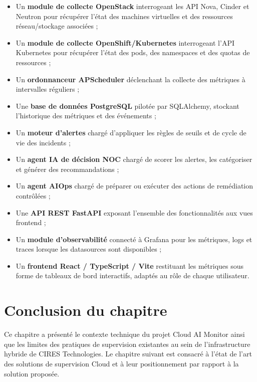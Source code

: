 \documentclass[11pt,a4paper]{report}
\begin{document}
\begin{itemize}[label=\textbullet, leftmargin=1.5cm, labelsep=0.5cm,
                itemsep=0.1em, parsep=0em, topsep=0.2em]
    \item Un \textbf{module de collecte OpenStack} interrogeant les API Nova,
    Cinder et Neutron pour récupérer l'état des machines virtuelles et des
    ressources réseau/stockage associées ;
    \item Un \textbf{module de collecte OpenShift/Kubernetes} interrogeant
    l'API Kubernetes pour récupérer l'état des pods, des namespaces et des
    quotas de ressources ;
    \item Un \textbf{ordonnanceur APScheduler} déclenchant la collecte des
    métriques à intervalles réguliers ;
    \item Une \textbf{base de données PostgreSQL} pilotée par SQLAlchemy,
    stockant l'historique des métriques et des événements ;
    \item Un \textbf{moteur d'alertes} chargé d'appliquer les règles de
    seuils et de cycle de vie des incidents ;
    \item Un \textbf{agent IA de décision NOC} chargé de scorer les alertes,
    les catégoriser et générer des recommandations ;
    \item Un \textbf{agent AIOps} chargé de préparer ou exécuter des actions
    de remédiation contrôlées ;
    \item Une \textbf{API REST FastAPI} exposant l'ensemble des
    fonctionnalités aux vues frontend ;
    \item Un \textbf{module d'observabilité} connecté à Grafana pour les
    métriques, logs et traces lorsque les datasources sont disponibles ;
    \item Un \textbf{frontend React / TypeScript / Vite} restituant les
    métriques sous forme de tableaux de bord interactifs, adaptés au rôle de
    chaque utilisateur.
\end{itemize}

\section*{Conclusion du chapitre}

Ce chapitre a présenté le contexte technique du projet Cloud AI Monitor ainsi
que les limites des pratiques de supervision existantes au sein de
l'infrastructure hybride de CIRES Technologies. Le chapitre suivant est
consacré à l'état de l'art des solutions de supervision Cloud et à leur
positionnement par rapport à la solution proposée.
\end{document}
